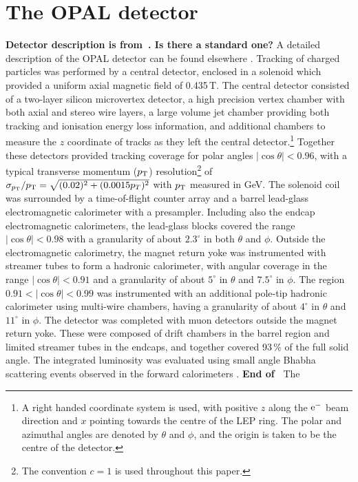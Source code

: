 \section{The OPAL detector}
\label{sec:detector}
{\bf Detector description is from~\cite{Abbiendi:2005eq}. Is there a standard one?}
A detailed description of the OPAL detector can be found elsewhere 
\cite{Ahmet:1990eg, Anderson:1997xwa}. Tracking of charged particles was performed by a central
detector, enclosed in a solenoid which provided a uniform axial magnetic field
of 0.435\,T.  The central detector consisted of a two-layer silicon 
microvertex detector, a high precision vertex chamber with both axial
and stereo wire layers, a large volume jet chamber providing both tracking
and ionisation energy loss information,
and additional chambers to measure the $z$ coordinate of tracks as they
left the central detector.\footnote{A right handed coordinate system is used,
with positive $z$ along the $\rm e^-$ beam direction and $x$ pointing 
towards the centre of the LEP ring. The polar and azimuthal angles are denoted
by $\theta$ and $\phi$, and the origin is taken to be the centre of the
detector.} Together these detectors provided tracking coverage for polar angles
$|\cos\theta|<0.96$, with a typical transverse momentum ($p_{\rm T}$) 
resolution\footnote{The convention $c=1$ is used throughout this paper.} of 
$\sigma_{p_{\rm T}}/p_{\rm T}=\sqrt{(0.02)^2+(0.0015p_T)^2}$ 
with $p_{\rm T}$ measured in GeV.
The solenoid coil was surrounded by a time-of-flight counter array and 
a barrel lead-glass electromagnetic calorimeter with a presampler. Including
also the endcap electromagnetic calorimeters, the lead-glass blocks covered
the range $|\cos\theta|<0.98$ with a granularity of about $2.3^\circ$ in both
$\theta$ and $\phi$.
Outside the electromagnetic calorimetry, 
the magnet return yoke was instrumented with
streamer tubes to form a hadronic calorimeter, with angular coverage in the
range $|\cos\theta|<0.91$ and a granularity of about $5^\circ$ in $\theta$
and $7.5^\circ$ in $\phi$. The region $0.91<|\cos\theta|<0.99$ was instrumented
with an additional pole-tip hadronic calorimeter using multi-wire chambers,
having a granularity of about $4^\circ$ in $\theta$ and $11^\circ$ in $\phi$.
The detector was completed
with muon detectors outside the magnet return yoke. These were composed
of drift chambers in the barrel region and limited streamer tubes in the
endcaps, and together covered 93\,\% of the full solid angle.
The integrated luminosity was evaluated using small
angle Bhabha scattering events observed in the forward calorimeters 
\cite{Abbiendi:2003dh}. 
{\bf End of~\cite{Abbiendi:2005eq}}
The 


